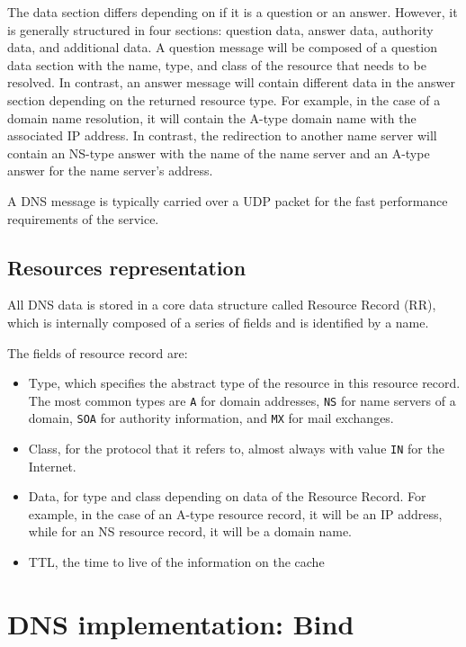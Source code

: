 \documentclass[11pt,a4paper]{article}
\begin{document}
\noindent
The data section differs depending on if it is a question or an answer. However, it is generally structured
in four sections: question data, answer data, authority data, and additional data. A question
message will be composed of a question data section with the name, type, and class of the
resource that needs to be resolved. In contrast, an answer message will contain different data in the
answer section depending on the returned resource type. For example, in the case of a
domain name resolution, it will contain the A-type domain name with the associated IP address. In contrast, the redirection to another name server will contain an NS-type answer with the name of the
name server and an A-type answer for the name server's address.

\hfill \break
\noindent
A DNS message is typically carried over a UDP packet for the fast performance requirements
of the service.

\subsection{Resources representation}
All DNS data is stored in a core data structure called Resource Record (RR), which is internally
composed of a series of fields and is identified by a name.

\hfill \break
\noindent
The fields of resource record are:
\begin{itemize}
\item Type, which specifies the abstract type of the resource in this resource record. The most common types are \texttt{A} for domain addresses, \texttt{NS} for name servers of a domain, \texttt{SOA} for authority information, and \texttt{MX} for mail exchanges.
\item Class, for the protocol that it refers to, almost always with value \texttt{IN} for the Internet.
\item Data, for type and class depending on data of the Resource Record. For example, in the case of an A-type resource record, it will be an IP address, while for an NS resource record, it will be a domain name.
\item TTL, the time to live of the information on the cache
\end{itemize}

\section{DNS implementation: Bind}
\end{document}
